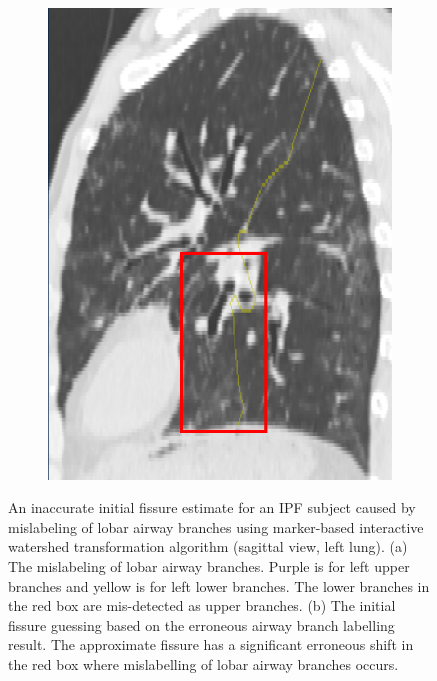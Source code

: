 {\begin{figure}[H]
\begin{subfigure}{.265\linewidth}
  \includegraphics[width=\linewidth,trim={{.0\wd0} {.0\wd0} {.0\wd0} {.0\wd0}},clip]{Segmentation/Image/YUAN_WateredFissureGuessing.png}
  \caption{}
  \label{fig:WateredAirwayMislabelled-b} 
\end{subfigure}
\caption{An inaccurate initial fissure estimate for an IPF subject caused by mislabeling of lobar airway branches using marker-based interactive watershed transformation algorithm (sagittal view, left lung). (a) The mislabeling of lobar airway branches. Purple is for left upper branches and yellow is for left lower branches. The lower branches in the red box are mis-detected as upper branches. (b) The initial fissure guessing based on the erroneous airway branch labelling result. The approximate fissure has a significant erroneous shift in the red box where mislabelling of lobar airway branches occurs.}
\label{fig:WateredAirwayMislabelled}
\end{figure}

}
